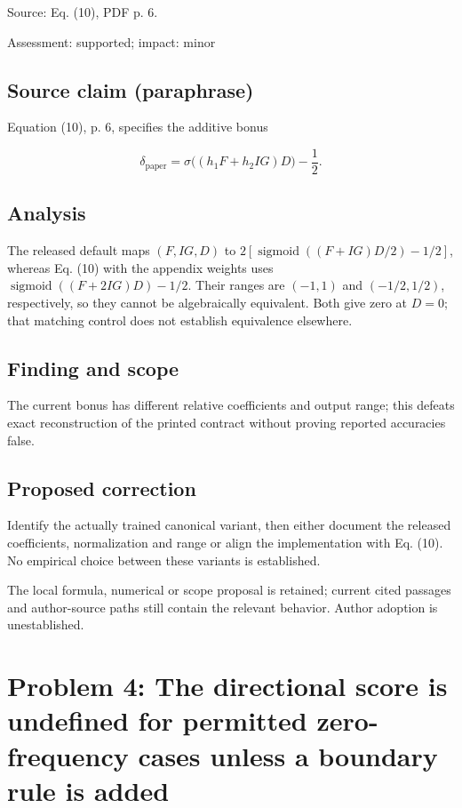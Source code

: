 \documentclass[11pt]{article}
\begin{document}
Source: Eq. (10), PDF p. 6.

Assessment: supported; impact: minor

\subsection*{Source claim (paraphrase)}

Equation (10), p. 6, specifies the additive bonus

\[ \delta_{\mathrm{paper}} =\sigma\big((h_1F+h_2IG)D\big)-\frac12. \]

\subsection*{Analysis}

The released default maps \((F,IG,D)\) to \(2[\operatorname{sigmoid}((F+IG)D/2)-1/2]\), whereas Eq. (10) with the appendix weights uses \(\operatorname{sigmoid}((F+2IG)D)-1/2\). Their ranges are \((-1,1)\) and \((-1/2,1/2)\), respectively, so they cannot be algebraically equivalent. Both give zero at \(D=0\); that matching control does not establish equivalence elsewhere.

\subsection*{Finding and scope}

The current bonus has different relative coefficients and output range; this defeats exact reconstruction of the printed contract without proving reported accuracies false.

\subsection*{Proposed correction}

Identify the actually trained canonical variant, then either document the released coefficients, normalization and range or align the implementation with Eq. (10). No empirical choice between these variants is established.

The local formula, numerical or scope proposal is retained; current cited passages and author-source paths still contain the relevant behavior. Author adoption is unestablished.

\section*{Problem 4: The directional score is undefined for permitted zero-frequency cases unless a boundary rule is added}
\end{document}
